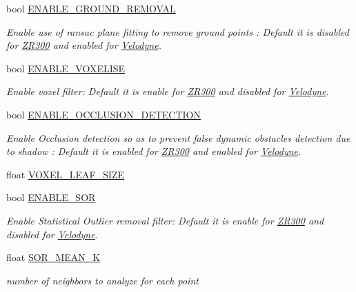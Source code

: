 \begin{DoxyCompactItemize}
bool \hyperlink{classdatmo_1_1cloud__segmentation_a03474f362047eb23fbcc53e5ce943148}{E\+N\+A\+B\+L\+E\+\_\+\+G\+R\+O\+U\+N\+D\+\_\+\+R\+E\+M\+O\+V\+AL}
\begin{DoxyCompactList}\small\item\em Enable use of ransac plane fitting to remove ground points \+: Default it is disabled for \hyperlink{classZR300}{Z\+R300} and enabled for \hyperlink{classVelodyne}{Velodyne}. \end{DoxyCompactList}\item 
bool \hyperlink{classdatmo_1_1cloud__segmentation_aa3af9f5d3b0072cba61c14cff25965cb}{E\+N\+A\+B\+L\+E\+\_\+\+V\+O\+X\+E\+L\+I\+SE}
\begin{DoxyCompactList}\small\item\em Enable voxel filter\+: Default it is enable for \hyperlink{classZR300}{Z\+R300} and disabled for \hyperlink{classVelodyne}{Velodyne}. \end{DoxyCompactList}\item 
bool \hyperlink{classdatmo_1_1cloud__segmentation_a5f7ffa75c60af605cc914de7296cddb1}{E\+N\+A\+B\+L\+E\+\_\+\+O\+C\+C\+L\+U\+S\+I\+O\+N\+\_\+\+D\+E\+T\+E\+C\+T\+I\+ON}
\begin{DoxyCompactList}\small\item\em Enable Occlusion detection so as to prevent false dynamic obstacles detection due to shadow \+: Default it is enabled for \hyperlink{classZR300}{Z\+R300} and enabled for \hyperlink{classVelodyne}{Velodyne}. \end{DoxyCompactList}\item 
float \hyperlink{classdatmo_1_1cloud__segmentation_af6f1f8553f2a18176ae84b78ddea07c9}{V\+O\+X\+E\+L\+\_\+\+L\+E\+A\+F\+\_\+\+S\+I\+ZE}
\item 
bool \hyperlink{classdatmo_1_1cloud__segmentation_ae54c11225658974ed8a37a03815aab0e}{E\+N\+A\+B\+L\+E\+\_\+\+S\+OR}
\begin{DoxyCompactList}\small\item\em Enable Statistical Outlier removal filter\+: Default it is enable for \hyperlink{classZR300}{Z\+R300} and disabled for \hyperlink{classVelodyne}{Velodyne}. \end{DoxyCompactList}\item 
float \hyperlink{classdatmo_1_1cloud__segmentation_abb5b1262c14e68886e01e0230c530b07}{S\+O\+R\+\_\+\+M\+E\+A\+N\+\_\+K}
\begin{DoxyCompactList}\small\item\em number of neighbors to analyze for each point \end{DoxyCompactList}\item 

\end{DoxyCompactItemize}

